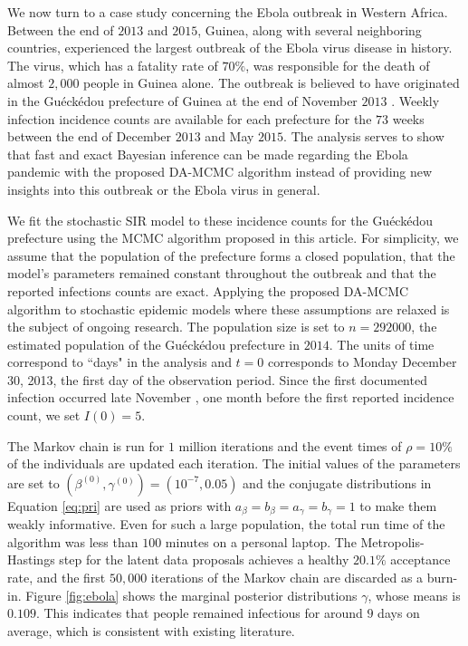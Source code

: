 \documentclass[11pt]{article}
\newcommand{\ram}[1]{{\color{green}{ #1}}}
\begin{document}
	We now turn to a case study concerning the Ebola outbreak in Western Africa.
	Between the end of $2013$ and $2015$, Guinea, along with several neighboring countries, experienced the largest outbreak of the Ebola virus disease in history. The virus, which has a fatality rate of $70\%$, was responsible for the death of almost $2,000$ people in Guinea alone.
	The outbreak is believed to have originated in the Gu\'eck\'edou prefecture of Guinea at the end of November $2013$ \cite{Baize.2014}. Weekly infection incidence counts are available for each prefecture for the $73$ weeks between the end of December $2013$ and May $2015$.
	The analysis serves to show that fast and exact Bayesian inference can be made regarding the Ebola pandemic with the proposed DA-MCMC algorithm instead of providing new insights into this outbreak or the Ebola virus in general.
	
	We fit the stochastic SIR model to these incidence counts for the Gu\'eck\'edou prefecture using the MCMC algorithm proposed in this article.
	For simplicity, we assume that the population of the prefecture forms a closed population, that the model's parameters remained constant throughout the outbreak and that the reported infections counts are exact.
	\ram{Justify these assumptions.}
	Applying the proposed DA-MCMC algorithm to stochastic epidemic models where these assumptions are relaxed is the subject of ongoing research.
	The population size is set to $n = 292000$, the estimated population of the Gu\'eck\'edou prefecture in $2014$.
	The units of time correspond to ``days" in the analysis and $t=0$ corresponds to Monday December 30, 2013, the first day of the observation period.
	Since the first documented infection occurred late November \cite{Baize.2014}, one month before the first reported incidence count, we set $I(0) = 5$.
	
	The Markov chain is run for $1$ million iterations and the event times of $\rho=10\%$ of the individuals are updated each iteration. The initial values of the parameters are set to $(\beta^{(0)}, \gamma^{(0)}) = (10^{-7}, 0.05)$ and the conjugate distributions in Equation \ref{eq:pri} are used as priors with $a_{\beta} = b_{\beta} = a_{\gamma} = b_{\gamma} = 1$ to make them weakly informative. Even for such a large population, the total run time of the algorithm was less than $100$ minutes on a personal laptop.
	The Metropolis-Hastings step for the latent data proposals achieves a healthy $20.1\%$ acceptance rate, and the first $50,000$ iterations of the Markov chain are discarded as a burn-in.
	Figure \ref{fig:ebola} shows the marginal posterior distributions $\gamma$, whose means is $0.109$. This indicates that people remained infectious for around $9$ days on average, which is consistent with existing literature. 
	
\end{document}
